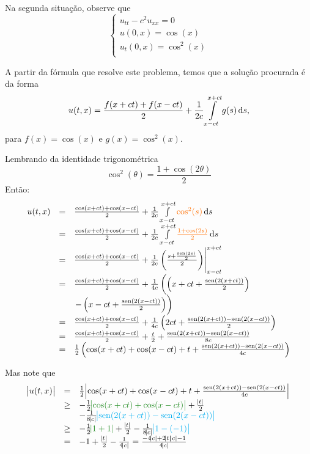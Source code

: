 \documentclass[11pt,a4paper]{article}
\begin{document}
{Na segunda situação, observe que 
\[\left\{\begin{array}{c}
     u_{tt} - c^2u_{xx} = 0  \\
     u(0, x) = \cos(x) \\
     u_t(0, x) = \cos^2(x) \\
\end{array}\right.\]

A partir da fórmula que resolve este problema, temos que a solução procurada é da forma
\[
u(t,x) = \frac{f(x + ct) + f(x - ct)}{2} + \frac{1}{2c} \int\limits_{x  -ct}^{x + ct} g(s) \dif s,
\]
para $f(x) = \cos(x)$ e $g(x) = \cos^2(x).$

Lembrando da identidade trigonométrica
\[\cos^2(\theta) = \frac{1 + \cos\left(2 \theta \right)}{2}
\]
Então:
\[\begin{array}{lcl}
u(t,x) &=& \frac{\cos(x + ct) + \cos(x - ct)}{2} + \frac{1}{2c} \int\limits_{x  -ct}^{x + ct} \textcolor{Laranja}{\cos^2(s)} \dif s  \\
&=& \frac{\cos(x + ct) + \cos(x - ct)}{2} + \frac{1}{2c} \int\limits_{x - ct}^{x + ct} \textcolor{Laranja}{\frac{1 + \cos\left(2 s\right)}{2}} \dif s  \\
& = & \frac{\cos(x + ct) + \cos(x - ct)}{2} + \frac{1}{2c}\left(\frac{s + \frac{\sen(2s)}{2}}{2}   \right) \Biggr|_{x  -ct}^{x + ct} \\
& = &  \frac{\cos(x + ct) + \cos(x - ct)}{2} + \frac{1}{4c} \left(\left(x + ct + \frac{\sen(2(x+ct))}{2}\right)\right. \\
& & \left. - \left(x - ct + \frac{\sen(2(x- ct))}{2}\right) \right) \\
& = &  \frac{\cos(x + ct) + \cos(x - ct)}{2} + \frac{1}{4c} \left(2ct + \frac{\sen(2(x+ct)) - \sen(2(x- ct))}{2}\right) \\
& = &  \frac{\cos(x + ct) + \cos(x - ct)}{2} + \frac{t}{2} + \frac{\sen(2(x+ct)) - \sen(2(x- ct))}{8c} \\

& = &  \frac{1}{2} \left(\cos(x + ct) + \cos(x - ct) + t + \frac{\sen(2(x+ct)) - \sen(2(x- ct))}{4c} \right) \\
\end{array}
\]

Mas note que
\[
\begin{array}{lcl}
\abs{u(t,x)} & = & \frac{1}{2} \abs{\cos(x + ct) + \cos(x - ct) + t + \frac{\sen(2(x+ct)) - \sen(2(x- ct))}{4c} }\\
& \ge & -\frac{1}{2} \textcolor{Floresta}{\abs{ \cos(x + ct) + \cos(x - ct)}} + \frac{\abs{t}}{2} \\
& & -\frac{1}{8\abs{c} } \textcolor{cyan}{\abs{\sen(2(x+ct)) - \sen(2(x - ct)) }} \\
& \ge & -\frac{1}{2} \textcolor{Floresta}{\abs{ 1 + 1}} +  \frac{\abs{t}}{2} - \frac{1}{8\abs{c} } \textcolor{cyan}{\abs{1 - (-1) }} \\
& = & -1 + \frac{\abs{t}}{2} - \frac{1}{4\abs{c}} = \frac{-4\abs{c} + 2  \abs{t} \abs{c} - 1}{4 \abs{c}}
\end{array}
\]

}
\end{document}

